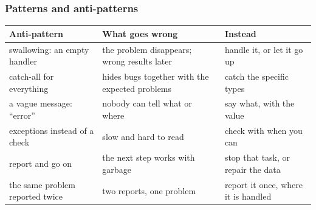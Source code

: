\documentclass[aspectratio=169,10pt,compress]{beamer}
\begin{document}
\begin{frame}[t,fragile] \frametitle{Patterns and anti-patterns}


\begin{table}
		\footnotesize
		\begin{tabular}{@{}L{0.24\textwidth}L{0.36\textwidth}L{0.32\textwidth}@{}}
			\toprule
			\textbf{Anti-pattern} & \textbf{What goes wrong} & \textbf{Instead} \\
			\midrule
			swallowing: an empty handler     & the problem disappears; wrong results later & handle it, or let it go up \\
			catch-all for everything          & hides bugs together with the expected problems & catch the specific types \\
			a vague message: ``error''        & nobody can tell what or where               & say what, with the value \\
			exceptions instead of a check     & slow and hard to read                      & check with  when you can \\
			report and go on                  & the next step works with garbage            & stop that task, or repair the data \\
			the same problem reported twice   & two reports, one problem                    & report it once, where it is handled \\
			\bottomrule
		\end{tabular}
\end{table}%
\end{frame}




\end{document}
